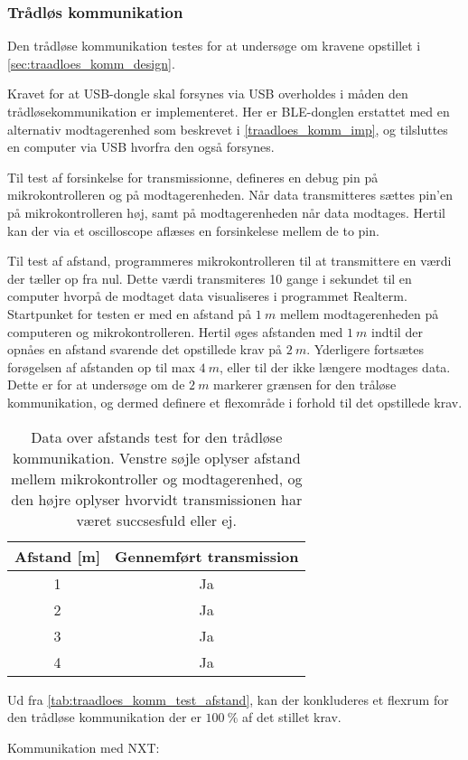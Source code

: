 \subsubsection{Trådløs kommunikation}
Den trådløse kommunikation testes for at undersøge om kravene opstillet i \autoref{sec:traadloes_komm_design}. 

\noindent
Kravet for at USB-dongle skal forsynes via USB overholdes i måden den trådløsekommunikation er implementeret. Her er BLE-donglen erstattet med en alternativ modtagerenhed som beskrevet i \autoref{traadloes_komm_imp}, og tilsluttes en computer via USB hvorfra den også forsynes. 

\noindent
Til test af forsinkelse for transmissionne, defineres en debug pin på mikrokontrolleren og på modtagerenheden. Når data transmitteres sættes pin'en på mikrokontrolleren høj, samt på modtagerenheden når data modtages. Hertil kan der via et oscilloscope aflæses en forsinkelese mellem de to pin. 

\noindent
Til test af afstand, programmeres mikrokontrolleren til at transmittere en værdi der tæller op fra nul. Dette værdi transmiteres 10 gange i sekundet til en computer hvorpå de modtaget data visualiseres i programmet Realterm.
Startpunket for testen er med en afstand på $1~m$ mellem modtagerenheden på computeren og mikrokontrolleren. 
Hertil øges afstanden med $1~m$ indtil der opnåes en afstand svarende det opstillede krav på $2~m$. Yderligere fortsætes forøgelsen af afstanden op til max $4~m$, eller til der ikke længere modtages data. Dette er for at undersøge om de $2~m$ markerer grænsen for den tråløse kommunikation, og dermed definere et flexområde i forhold til det opstillede krav.  

\begin{table}[H]
\centering
\begin{tabular}{|c|c|}
\hline 
Afstand [m] & Gennemført transmission \\ 
\hline 
1 & Ja \\ 
\hline 
2 & Ja \\ 
\hline 
3 & Ja \\ 
\hline 
4 & Ja \\ 
\hline 
\end{tabular} 
\caption{Data over afstands test for den trådløse kommunikation. Venstre søjle oplyser afstand mellem mikrokontroller og modtagerenhed, og den højre oplyser hvorvidt transmissionen har været succsesfuld eller ej.}
\label{tab:traadloes_komm_test_afstand}
\end{table}

Ud fra \autoref{tab:traadloes_komm_test_afstand}, kan der konkluderes et flexrum for den trådløse kommunikation der er $100~\%$ af det stillet krav. 

Kommunikation med NXT:
